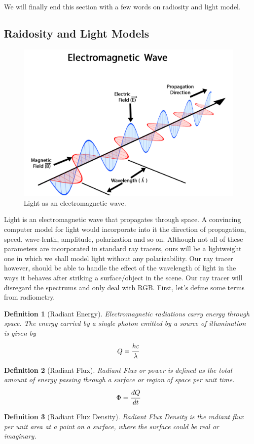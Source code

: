 \documentclass[a4paper, 12pt]{article}
\newtheorem{definition}{Definition}
\begin{document}
	We will finally end this section with a few words 
	on radiosity and light model.

\subsection{Raidosity and Light Models}
\begin{center}
\begin{figure}
	\includegraphics[width=0.6\linewidth, scale=0.8]{lightem.png}
	\centering
	\caption{Light as an electromagnetic wave.}
\end{figure}
\end{center}
Light is an electromagnetic wave that propagates through space. 
A convincing computer model for light would incorporate into it 
the direction of propagation, speed, wave-lenth, amplitude, polarization 
and so on. Although not all of these parameters are incorporated in 
standard ray tracers, ours will be a lightweight one in which we 
shall model light without any polarizability.
Our ray tracer however, should be able to handle the effect of 
the wavelength of light in the ways it behaves after striking 
a surface/object in the scene. Our 
ray tracer will disregard the spectrums and 
only deal with RGB. First, let's define some terms from radiometry.

\begin{definition}[Radiant Energy]
Electromagnetic radiations carry energy through space.
The energy carried by a single photon emitted by a source 
of illumination is given by 
$$
	Q = \cfrac{hc}{\lambda}
$$
\end{definition}

\begin{definition}[Radiant Flux]
Radiant Flux or power is defined as the total amount of energy passing 
through a surface or region of space per unit time.
$$
	\Phi = \cfrac{dQ}{dt}
$$
\end{definition}

\begin{definition}[Radiant Flux Density]
	Radiant Flux Density is the radiant flux per unit area at a 
	point on a surface, where the surface could be real or imaginary.
\end{definition}
\end{document}
